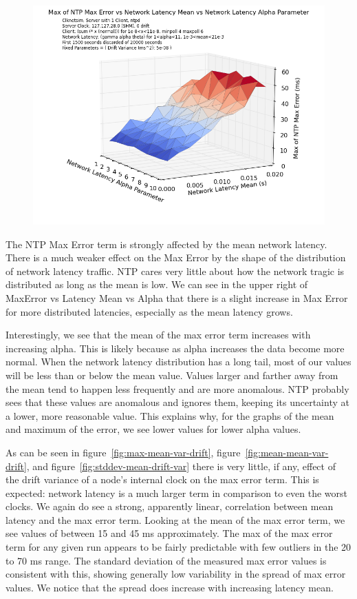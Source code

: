 \begin{figure}[h]
  \includegraphics[width=0.8\linewidth]{max_error-latency_mean-latency_alpha.png}
\end{figure}

The NTP Max Error term is strongly affected by the mean network
latency. There is a much weaker effect on the Max Error by the shape
of the distribution of network latency traffic. NTP cares very little
about how the network tragic is distributed as long as the mean is
low. We can see in the upper right of MaxError vs Latency Mean vs
Alpha that there is a slight increase in Max Error for more
distributed latencies, especially as the mean latency grows.

Interestingly, we see that the mean of the max error term increases
with increasing alpha. This is likely because as alpha increases the
data become more normal. When the network latency distribution has a
long tail, most of our values will be less than or below the mean
value. Values larger and farther away from the mean tend to happen
less frequently and are more anomalous. NTP probably sees that these
values are anomalous and ignores them, keeping its uncertainty at a
lower, more reasonable value. This explains why, for the graphs of the
mean and maximum of the error, we see lower values for lower alpha
values.

As can be seen in figure~\ref{fig:max-mean-var-drift},
figure~\ref{fig:mean-mean-var-drift}, and
figure~\ref{fig:stddev-mean-drift-var} there is very little, if any,
effect of the drift variance of a node's internal clock on the max
error term. This is expected: network latency is a much larger term in
comparison to even the worst clocks. We again do see a strong,
apparently linear, correlation between mean latency and the max error
term. Looking at the mean of the max error term, we see values of
between 15 and 45 ms approximately. The max of the max error term for
any given run appears to be fairly predictable with few outliers in
the 20 to 70 ms range. The standard deviation of the measured max
error values is consistent with this, showing generally low
variability in the spread of max error values. We notice that the
spread does increase with increasing latency mean.


